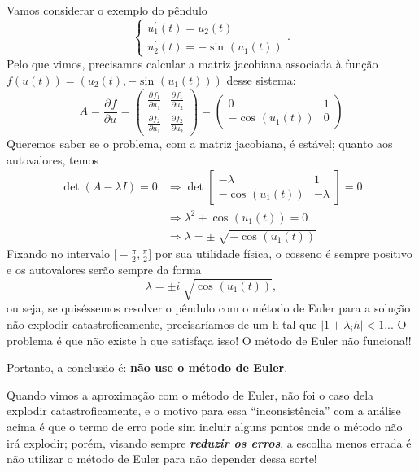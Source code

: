 \documentclass[../differential_methods.tex]{subfiles}
\begin{document}
\begin{example}
	Vamos considerar o exemplo do pêndulo
	\[
		\left\{\begin{array}{ll}
			u_{1}^{'}(t) = u_2(t) \\
			u_{2}^{'}(t) = -\sin^{}{(u_1(t))}
		\end{array}\right..
	\]
	Pelo que vimos, precisamos calcular a matriz jacobiana associada à função \(f(u(t)) = (u_2(t), -\sin^{}{(u_1(t))})\) desse sistema:
	\[
		A = \frac{\partial^{}f}{\partial u^{}} = \begin{pmatrix}
			\frac{\partial^{}f_1}{\partial u_1^{}} & \frac{\partial^{}f_1}{\partial u_2^{}} \\
			\frac{\partial^{}f_2}{\partial u_1^{}} & \frac{\partial^{}f_2}{\partial u_2^{}}
		\end{pmatrix} = \begin{pmatrix}
			0                  & 1 \\
			-\cos^{}{(u_1(t))} & 0
		\end{pmatrix}
	\]
	Queremos saber se o problema, com a matriz jacobiana, é estável; quanto aos autovalores, temos
	\begin{align*}
		\det{(A - \lambda I)} = 0 & \Rightarrow \det\begin{bmatrix}
			                                            -\lambda           & 1        \\
			                                            -\cos^{}{(u_1(t))} & -\lambda
		                                            \end{bmatrix} = 0          \\
		                          & \Rightarrow \lambda^{2} + \cos^{}{(u_1(t))} = 0        \\
		                          & \Rightarrow \lambda  = \pm \sqrt[]{-\cos^{}{(u_1(t))}}
	\end{align*}
	Fixando no intervalo \(\displaystyle \biggl[-\frac{\pi }{2}, \frac{\pi }{2}\biggr]\) por sua utilidade física, o cosseno é sempre positivo e os autovalores serão sempre da forma
	\[
		\lambda = \pm i \sqrt[]{\cos^{}{(u_1(t))}},
	\]
	ou seja, se quiséssemos resolver o pêndulo com o método de Euler para a solução não explodir catastroficamente, precisaríamos de um h tal que \(| 1+\lambda_{i}h | < 1\)... O problema é que não existe h que satisfaça isso! O método de Euler não funciona!!

	Portanto, a conclusão é: \textbf{não use o método de Euler}.
\end{example}
\begin{tcolorbox}[
		skin=enhanced,
		title=Observação,
		fonttitle=\bfseries,
		colframe=black,
		colbacktitle=cyan!75!white,
		colback=cyan!15,
		colbacklower=black,
		coltitle=black,
		drop fuzzy shadow,
	]
	Quando vimos a aproximação com o método de Euler, não foi o caso dela explodir catastroficamente, e o motivo para essa ``inconsistência'' com a análise acima é que o termo de erro pode sim incluir alguns pontos onde o método não irá explodir; porém, visando sempre \textbf{\textit{reduzir os erros}}, a escolha menos errada é não utilizar o método de Euler para não depender dessa sorte!
\end{tcolorbox}
\end{document}
